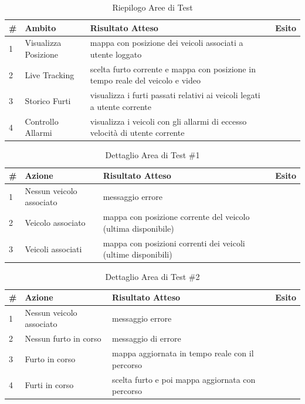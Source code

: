 \documentclass[a4paper,12pt]{article}
\begin{document}
\begin{table}[h]
\begin{center}
\caption{Riepilogo Aree di Test}
\begin{tabular}{p{0.5cm} p{3.8cm} p{7.7cm} p{1cm}}
\rowcolor{Ash}
\hline
\# & Ambito & Risultato Atteso & Esito \\ \hline
1 & Visualizza Posizione	& mappa con posizione dei veicoli associati a utente loggato			& \cellcolor{green}{OK}\\
2 & Live Tracking		& scelta furto corrente e mappa con posizione in tempo reale del veicolo e video & \cellcolor{green}{OK}\\
3 & Storico Furti		& visualizza i furti passati relativi ai veicoli legati a utente corrente		& \cellcolor{green}{OK}\\
4 & Controllo Allarmi	 &	visualizza i veicoli con gli allarmi di eccesso velocità  di utente corrente		& \cellcolor{green}{OK}\\
\hline
\end{tabular}
\end{center}
\end{table}

\begin{table}[h]
\begin{center}
\caption{Dettaglio Area di Test \#1}
\begin{tabular}{p{0.5cm} p{4.5cm} p{7cm} p{1cm}}
\rowcolor{Ash}
\hline
\# & Azione & Risultato Atteso & Esito \\ \hline
1 & Nessun veicolo associato	&	messaggio errore									&	\cellcolor{green}{OK}\\
2 & Veicolo associato	&		mappa con posizione corrente del veicolo (ultima disponibile)  &	\cellcolor{green}{OK}\\
3 & Veicoli associati		&		mappa con posizioni correnti dei veicoli (ultime disponibili)       &	\cellcolor{green}{OK}\\ \hline
\end{tabular}
\end{center}
\end{table}

\begin{table}[h]
\begin{center}
\caption{Dettaglio Area di Test \#2}
\begin{tabular}{p{0.5cm} p{4.5cm} p{7cm} p{1cm}}
\rowcolor{Ash}
\hline
\# & Azione & Risultato Atteso & Esito \\ \hline
1 & Nessun veicolo associato	& messaggio errore		&	\cellcolor{green}{OK}\\
2 & Nessun furto in corso		&	messaggio di errore & 	\cellcolor{green}{OK}\\
3 & Furto in corso			&	mappa aggiornata in tempo reale con il percorso	&	\cellcolor{green}{OK}\\
4 & Furti in corso			&	scelta furto e poi mappa aggiornata con percorso	&	\cellcolor{green}{OK}\\ \hline
\end{tabular}
\end{center}
\end{table}
\end{document}
